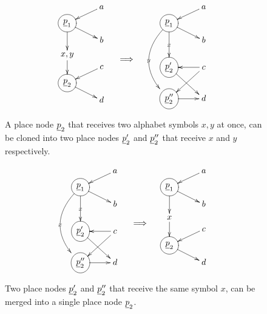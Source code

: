 \begin{figure}[h!]
$$
\begin{array}{ccc}
\xymatrix@R=.3pc{
& a\ar[dl]
\\
\Circle{\rvp_1}\ar[rd]
\ar[dd]
\\
& b
\\
x,y\ar[dd]
\\
&c\ar[dl]
\\
\Circle{\rvp_2}\ar[rd]
\\
&d
}
&
\xymatrix
{
\\
\\
\implies}
&
\xymatrix@R=.3pc{
& a\ar[dl]
\\
\Circle{\rvp_1}\ar[rd]
\ar[ddd]|x
\ar@/_2pc/[ddddd]|y
\\
& b
\\
\\
\Circle{\rvp_2'}\ar[rdd]
&c\ar[ldd]\ar[l]
\\
\\
\Circle{\rvp_2''}\ar[r]
&d
}
\end{array}
$$
\caption{A place node $\rvp_2$
that receives two alphabet 
symbols $x, y$ at once, 
can be cloned into two place nodes
$\rvp_2'$ and $\rvp_2''$ that receive
 $x$ and $y$ respectively.
}
\label{fig-split-x-y}
\end{figure}


\begin{figure}[h!]
$$
\begin{array}{ccc}
\xymatrix@R=.3pc{
& a\ar[dl]
\\
\Circle{\rvp_1}\ar[rd]
\ar[ddd]|x
\ar@/_2pc/[ddddd]|x
\\
& b
\\
\\
\Circle{\rvp_2'}\ar[rdd]
&c\ar[ldd]\ar[l]
\\
\\
\Circle{\rvp_2''}\ar[r]
&d
}&
\xymatrix
{
\\
\\
\implies}
&
\xymatrix@R=.3pc{
& a\ar[dl]
\\
\Circle{\rvp_1}\ar[rd]
\ar[dd]
\\
& b
\\
x\ar[dd]
\\
&c\ar[dl]
\\
\Circle{\rvp_2}\ar[rd]
\\
&d
}
\end{array}
$$
\caption{Two place nodes $\rvp_2'$ and $\rvp_2''$
that receive the same symbol $x$, can be
merged into a single place node $\rvp_2$.}
\label{fig-merge-two-x}
\end{figure}